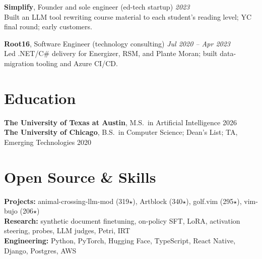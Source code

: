 \documentclass[10pt,letterpaper]{article}
\begin{document}
\vspace{4pt}
\textbf{Simplify}, Founder and sole engineer (ed-tech startup) \hfill \textit{2023} \\
Built an LLM tool rewriting course material to each student's reading level; YC final round; early customers.

\vspace{4pt}
\textbf{Root16}, Software Engineer (technology consulting) \hfill \textit{Jul 2020 -- Apr 2023} \\
Led .NET/C\# delivery for Energizer, RSM, and Plante Moran; built data-migration tooling and Azure CI/CD.

\section{Education}
\textbf{The University of Texas at Austin}, M.S.\ in Artificial Intelligence \hfill 2026 \\
\textbf{The University of Chicago}, B.S.\ in Computer Science; Dean's List; TA, Emerging Technologies \hfill 2020

\section{Open Source \& Skills}
\textbf{Projects:} animal-crossing-llm-mod (319$\star$), Artblock (340$\star$), golf.vim (295$\star$), vim-bujo (206$\star$) \\
\textbf{Research:} synthetic document finetuning, on-policy SFT, LoRA, activation steering, probes, LLM judges, Petri, IRT \\
\textbf{Engineering:} Python, PyTorch, Hugging Face, TypeScript, React Native, Django, Postgres, AWS
\end{document}

